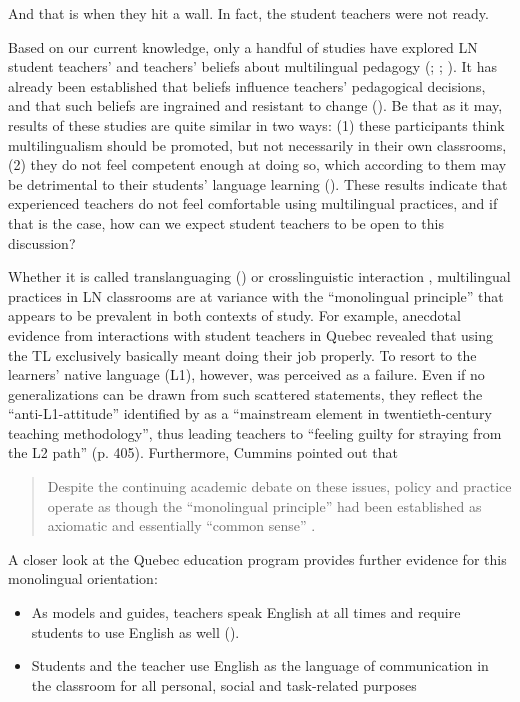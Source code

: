 \documentclass[output=paper]{../langscibook}
\begin{document}
And that is when they hit a wall. In fact, the student teachers were not ready.

Based on our current knowledge, only a handful of studies have explored LN student teachers’ and teachers’ beliefs about multilingual pedagogy (\citealt{ArocenaEgañaEtAl2015}; \citealt{CreeseBlackledge2010}; \citealt{DeAngelis2011,Haukås2016,Woll2020}). It has already been established that beliefs influence teachers’ pedagogical decisions, and that such beliefs are ingrained and resistant to change (\citealt{PhippsBorg2009}). Be that as it may, results of these studies are quite similar in two ways: (1) these participants think multilingualism should be promoted, but not necessarily in their own classrooms, (2) they do not feel competent enough at doing so, which according to them may be detrimental to their students’ language learning (\citealt{DeAngelis2011}). These results indicate that experienced teachers do not feel comfortable using multilingual practices, and if that is the case, how can we expect student teachers to be open to this discussion?

Whether it is called translanguaging (\citealt{GarciaLi2014}) or crosslinguistic interaction \citep{Jessner2008}, multilingual practices in LN classrooms are at variance with the “monolingual principle” \citep{Cummins2007} that appears to be prevalent in both contexts of study. For example, anecdotal evidence from interactions with student teachers in Quebec revealed that using the TL exclusively basically meant doing their job properly. To resort to the learners’ native language (L1), however, was perceived as a failure. Even if no generalizations can be drawn from such scattered statements, they reflect the “anti-L1-attitude” identified by \citet{Cook2001} as a “mainstream element in twentieth-century teaching methodology”, thus leading teachers to “feeling guilty for straying from the L2 path” (p. 405). Furthermore, Cummins pointed out that

\begin{quote}
Despite the continuing academic debate on these issues, policy and practice operate as though the “monolingual principle” had been established as axiomatic and essentially “common sense” \citep[224]{Cummins2007}. 
\end{quote}

A closer look at the Quebec education program provides further evidence for this monolingual orientation:

\begin{itemize}
\item  As models and guides, teachers speak English at all times and require students to use English as well (\citealt[7]{MEQ2007}).
\item Students and the teacher use English as the language of communication in the classroom for all personal, social and task-related purposes \citep{MEQ2007}
\end{itemize}
\end{document}

